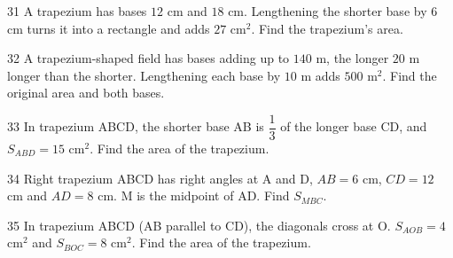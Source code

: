 \begin{probbox}{31}{}
A trapezium has bases $12$ cm and $18$ cm. Lengthening the shorter base by $6$ cm turns it into a rectangle and adds $27$ cm$^2$. Find the trapezium's area.
\end{probbox}
\gap
\begin{probbox}{32}{}
A trapezium-shaped field has bases adding up to $140$ m, the longer $20$ m longer than the shorter. Lengthening each base by $10$ m adds $500$ m$^2$. Find the original area and both bases.
\end{probbox}
\gap
\begin{probbox}{33}{}
In trapezium ABCD, the shorter base AB is $\dfrac13$ of the longer base CD, and $S_{ABD}=15$ cm$^2$. Find the area of the trapezium.
\end{probbox}
\gap
\begin{probbox}{34}{}
Right trapezium ABCD has right angles at A and D, $AB=6$ cm, $CD=12$ cm and $AD=8$ cm. M is the midpoint of AD. Find $S_{MBC}$.
\end{probbox}
\gap
\begin{probbox}{35}{}
In trapezium ABCD (AB parallel to CD), the diagonals cross at O. $S_{AOB}=4$ cm$^2$ and $S_{BOC}=8$ cm$^2$. Find the area of the trapezium.
\end{probbox}
